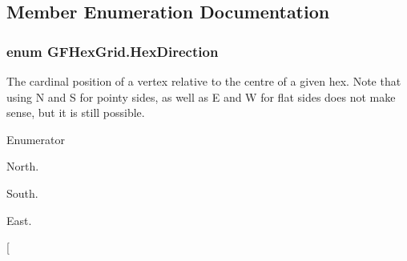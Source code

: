 \subsection{Member Enumeration Documentation}
\hypertarget{class_g_f_hex_grid_a4591076c54ef7c3b01f61f47ceb6439f_a4591076c54ef7c3b01f61f47ceb6439f}{
\subsubsection[{Hex\+Direction}]{\setlength{\rightskip}{0pt plus 5cm}enum {\bf G\+F\+Hex\+Grid.\+Hex\+Direction}}}\label{class_g_f_hex_grid_a4591076c54ef7c3b01f61f47ceb6439f_a4591076c54ef7c3b01f61f47ceb6439f}
The cardinal position of a vertex relative to the centre of a given hex. Note that using N and S for pointy sides, as well as E and W for flat sides does not make sense, but it is still possible. \begin{Desc}
\item[Enumerator]\par
\begin{description}
\item[{\em 
\hypertarget{class_g_f_hex_grid_a4591076c54ef7c3b01f61f47ceb6439f_a4591076c54ef7c3b01f61f47ceb6439fa8d9c307cb7f3c4a32822a51922d1ceaa}{N}\label{class_g_f_hex_grid_a4591076c54ef7c3b01f61f47ceb6439f_a4591076c54ef7c3b01f61f47ceb6439fa8d9c307cb7f3c4a32822a51922d1ceaa}
}]North. \item[{\em 
\hypertarget{class_g_f_hex_grid_a4591076c54ef7c3b01f61f47ceb6439f_a4591076c54ef7c3b01f61f47ceb6439fadc33066c3993e0d50896e533fd692ce0}{N\+E}\label{class_g_f_hex_grid_a4591076c54ef7c3b01f61f47ceb6439f_a4591076c54ef7c3b01f61f47ceb6439fadc33066c3993e0d50896e533fd692ce0}
}]South. \item[{\em 
\hypertarget{class_g_f_hex_grid_a4591076c54ef7c3b01f61f47ceb6439f_a4591076c54ef7c3b01f61f47ceb6439fa3a3ea00cfc35332cedf6e5e9a32e94da}{E}\label{class_g_f_hex_grid_a4591076c54ef7c3b01f61f47ceb6439f_a4591076c54ef7c3b01f61f47ceb6439fa3a3ea00cfc35332cedf6e5e9a32e94da}
}]East. \item[{\em 
}
\end{description}
\end{Desc}
